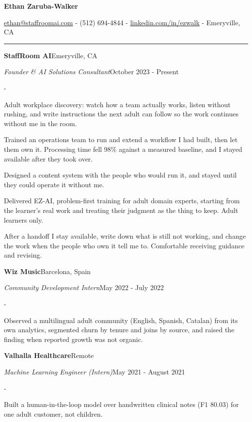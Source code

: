 \documentclass[10pt,letterpaper]{article}
\newenvironment{cvitems}{%
  \begin{list}{-}{%
    \setlength{\leftmargin}{12pt}%
    \setlength{\itemsep}{1.2pt}%
    \setlength{\parsep}{0pt}%
    \setlength{\topsep}{1.5pt}%
    \setlength{\partopsep}{0pt}%
    \setlength{\labelwidth}{6pt}%
    \setlength{\labelsep}{6pt}%
    \setlength{\itemindent}{0pt}%
  }%
}{\end{list}}
\newcommand{\cvsection}[1]{%
  \vspace{7pt}%
  \noindent{\bfseries\fontsize{11pt}{13pt}\selectfont\MakeUppercase{#1}}\par
  \vspace{1pt}%
  \noindent\rule{\textwidth}{0.4pt}\par
  \vspace{4pt}%
}
\newcommand{\cventryhead}[4]{%
  \noindent\textbf{#1}\hfill#2\par
  \vspace{0.5pt}%
  \noindent\textit{#3}\hfill#4\par
}
\begin{document}
\begin{center}
  {\bfseries\fontsize{22pt}{24pt}\selectfont Ethan Zaruba-Walker\par}
  \vspace{4pt}
  {\fontsize{10pt}{12pt}\selectfont
    \href{mailto:ethan@staffroomai.com}{ethan@staffroomai.com}
    {-}
    (512) 694-4844
    {-}
    \href{https://linkedin.com/in/ezwalk}{linkedin.com/in/ezwalk}
    {-}
    Emeryville, CA\par}
\end{center}
\vspace{2pt}

\cvsection{Experience}

\cventryhead{StaffRoom AI}{Emeryville, CA}
{Founder \& AI Solutions Consultant}{October 2023 - Present}
\begin{cvitems}
  \item Adult workplace discovery: watch how a team actually works, listen without rushing, and write instructions the next adult can follow so the work continues without me in the room.
  \item Trained an operations team to run and extend a workflow I had built, then let them own it. Processing time fell 98\% against a measured baseline, and I stayed available after they took over.
  \item Designed a content system with the people who would run it, and stayed until they could operate it without me.
  \item Delivered EZ-AI, problem-first training for adult domain experts, starting from the learner's real work and treating their judgment as the thing to keep. Adult learners only.
  \item After a handoff I stay available, write down what is still not working, and change the work when the people who own it tell me to. Comfortable receiving guidance and revising.
\end{cvitems}

\vspace{3pt}
\cventryhead{Wiz Music}{Barcelona, Spain}
{Community Development Intern}{May 2022 - July 2022}
\begin{cvitems}
  \item Observed a multilingual adult community (English, Spanish, Catalan) from its own analytics, segmented churn by tenure and joins by source, and raised the finding when reported growth was not organic.
\end{cvitems}

\vspace{3pt}
\cventryhead{Valhalla Healthcare}{Remote}
{Machine Learning Engineer (Intern)}{May 2021 - August 2021}
\begin{cvitems}
  \item Built a human-in-the-loop model over handwritten clinical notes (F1 80.03) for one adult customer, not children.
\end{cvitems}
\end{document}
